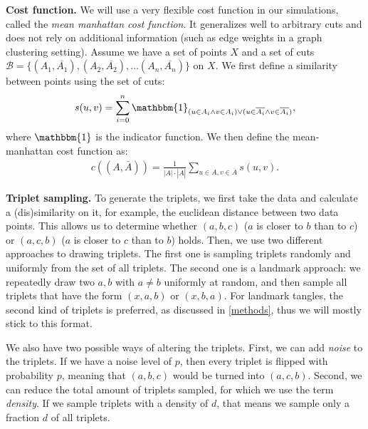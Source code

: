 \noindent
\textbf{Cost function.}
We will use a very flexible cost function in our simulations, called the \textit{mean manhattan cost function}.
It generalizes well to arbitrary cuts and does not rely on additional information (such as edge weights in a graph clustering setting). 
Assume we have a set of points $X$ and a set of cuts $\mathcal{B} = \{\left(A_1, \overline{A_1}\right),
\left( A_2, \overline{A_2} \right) , \ldots \left( A_n, \overline{A_n} \right) \}$ on $X$.
We first define a similarity between points using the set of cuts:
\begin{align}
s(u,v) = \sum_{i = 0}^{n} \mathbbm{1}_{\left(u \in A_i \wedge v \in A_i \right) \vee ( u \in \overline{A_i} \wedge v \in \overline{A_i} )}
,\end{align}
where $\mathbbm{1}$ is the indicator function. We then define the mean-manhattan cost function as:
\begin{align}\label{mmcf}
c((A, \overline{A})) = \frac{1}{\left| A \right| \cdot \left| \overline{A} \right| } \sum_{u \in A, v \in \overline{A}} s(u,v)
.\end{align}


\noindent
\textbf{Triplet sampling.}
To generate the triplets, we first take the data and calculate a (dis)similarity on it, for example, the euclidean distance between two data points. This allows
us to determine whether $(a,b,c)$ ($a$ is closer to $b$ than to $c$) or $(a,c,b)$ ($a$ is closer to $c$ than to $b$) holds.
Then, we use two different approaches to drawing triplets. The first one is sampling triplets randomly and uniformly from the set of all triplets. The second one is a landmark approach:
we repeatedly draw two $a,b$ with $a \neq b$ uniformly at random, and then sample all triplets that have the form $(x,a,b)$ or $(x,b,a)$. 
For landmark tangles, the second kind of triplets is preferred, as discussed in \autoref{methods}, thus we will mostly stick to this format. 

We also have two possible ways of altering the triplets. First, we can add \textit{noise}
to the triplets. If we have a noise level of $p$, then every triplet is flipped with probability $p$, meaning that $(a,b,c)$ would be turned into $(a,c,b)$. 
Second, we can reduce the total amount of triplets sampled, for which we use the term \textit{density}. 
If we sample triplets with a density of $d$, that means we sample only a fraction $d$ of all triplets. 

